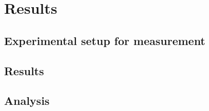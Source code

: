 \documentclass[../main.tex]{subfiles}
\begin{document}
	
\chapter{Results}

	\section{Experimental setup for measurement}
	
	\section{Results}
	
	\section{Analysis}
	
\end{document}
